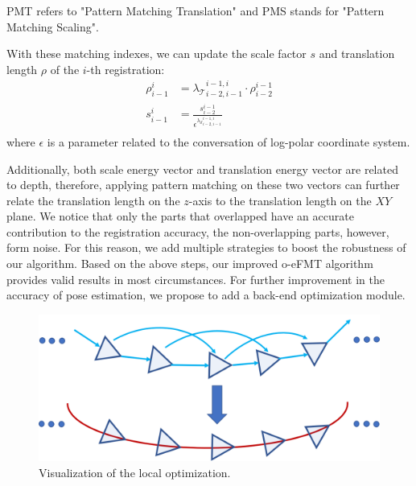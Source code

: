 \documentclass[letterpaper, 10 pt, conference]{ieeeconf}  %
\begin{document}
PMT refers to "Pattern Matching Translation" and PMS stands for "Pattern Matching Scaling".

With these matching indexes, we can update the scale factor $s$ and translation length $\rho$ of the $i$-th registration:
\begin{equation}
    \begin{aligned}
        \rho_{i-1}^{i} &= {\lambda_{\mathcal{T}}}_{i-2,i-1}^{i-1,i} \cdot \rho_{i-2}^{i-1} \\
        s_{i-1}^{i} &= \frac{s_{i-2}^{i-1}}{ \epsilon^{{\lambda_{\mathcal{S}}}_{i-2,i-1}^{i-1,i}}  } \\
    \end{aligned}
    \label{eq:update_after_PM}
\end{equation}
where $\epsilon$ is a parameter related to the conversation of log-polar coordinate system.

Additionally, both scale energy vector and translation energy vector are related to depth, therefore, 
applying pattern matching on these two vectors can further relate the translation length on the $z$-axis to the translation length on the $XY$ plane.
We notice that only the parts that overlapped have an accurate contribution to the registration accuracy, the non-overlapping parts, however, form noise. For this reason, we add multiple strategies to boost the robustness of our algorithm.
Based on the above steps, our improved o-eFMT algorithm provides valid results in most circumstances. For further improvement in the accuracy of pose estimation, we propose to add a back-end optimization module. 
\begin{figure}[t]
    \centering
    \includegraphics[width=0.9\linewidth]{images/poses.png}
    \caption{Visualization of the local optimization.}
    \label{fig:pose}
\end{figure}
\end{document}
